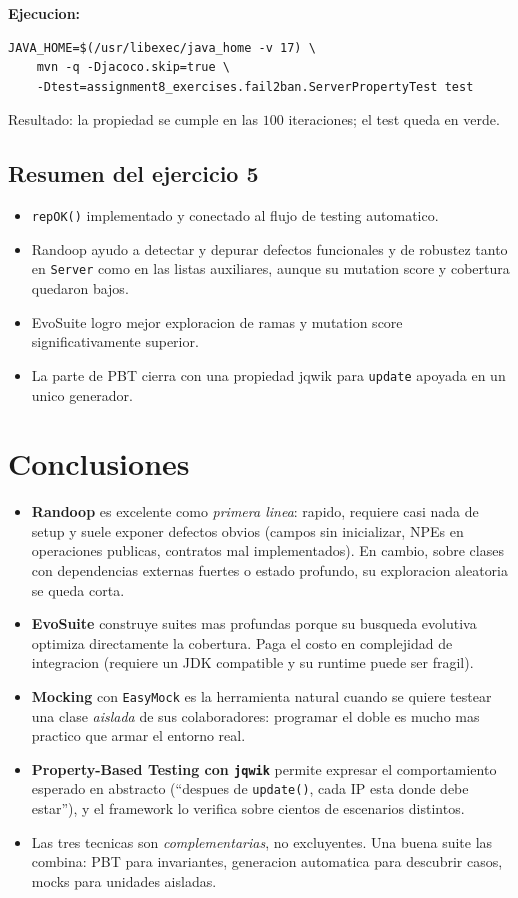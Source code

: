 \documentclass[12pt,a4paper]{article}
\begin{document}
\textbf{Ejecucion:}

\begin{lstlisting}[style=codestyle]
JAVA_HOME=$(/usr/libexec/java_home -v 17) \
    mvn -q -Djacoco.skip=true \
    -Dtest=assignment8_exercises.fail2ban.ServerPropertyTest test
\end{lstlisting}

Resultado: la propiedad se cumple en las $100$ iteraciones; el test queda en verde.

\subsection{Resumen del ejercicio 5}

\begin{itemize}
  \item \texttt{repOK()} implementado y conectado al flujo de testing automatico.
  \item Randoop ayudo a detectar y depurar defectos funcionales y de robustez tanto en
  \texttt{Server} como en las listas auxiliares, aunque su mutation score y cobertura
  quedaron bajos.
  \item EvoSuite logro mejor exploracion de ramas y mutation score significativamente
  superior.
  \item La parte de PBT cierra con una propiedad jqwik para \texttt{update} apoyada en un
  unico generador.
\end{itemize}

\section*{Conclusiones}

\begin{itemize}
  \item \textbf{Randoop} es excelente como \emph{primera linea}: rapido, requiere casi nada
  de setup y suele exponer defectos obvios (campos sin inicializar, NPEs en operaciones
  publicas, contratos mal implementados). En cambio, sobre clases con dependencias externas
  fuertes o estado profundo, su exploracion aleatoria se queda corta.
  \item \textbf{EvoSuite} construye suites mas profundas porque su busqueda evolutiva
  optimiza directamente la cobertura. Paga el costo en complejidad de integracion (requiere
  un JDK compatible y su runtime puede ser fragil).
  \item \textbf{Mocking} con \texttt{EasyMock} es la herramienta natural cuando se quiere
  testear una clase \emph{aislada} de sus colaboradores: programar el doble es mucho mas
  practico que armar el entorno real.
  \item \textbf{Property-Based Testing con \texttt{jqwik}} permite expresar el comportamiento
  esperado en abstracto (``despues de \texttt{update()}, cada IP esta donde debe estar''), y
  el framework lo verifica sobre cientos de escenarios distintos.
  \item Las tres tecnicas son \emph{complementarias}, no excluyentes. Una buena suite las
  combina: PBT para invariantes, generacion automatica para descubrir casos, mocks para
  unidades aisladas.
\end{itemize}
\end{document}
